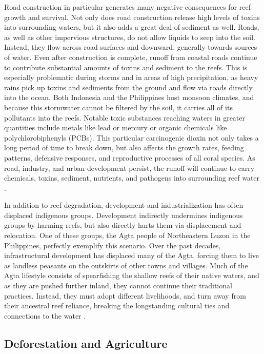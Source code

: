 \documentclass{book}\usepackage{knitr}
\begin{document}
\begin{knitrout}
\begin{kframe}
Road construction in particular generates many negative consequences for reef growth and survival. Not only does road construction release high levels of toxins into surrounding waters, but it also adds a great deal of sediment as well. Roads, as well as other impervious structures, do not allow liquids to seep into the soil. Instead, they flow across road surfaces and downward, generally towards sources of water. Even after construction is complete, runoff from coastal roads continue to contribute substantial amounts of toxins and sediment to the reefs. This is especially problematic during storms and in areas of high precipitation, as heavy rains pick up toxins and sediments from the ground and flow via roads directly into the ocean. Both Indonesia and the Philippines host monsoon climates, and because this stormwater cannot be filtered by the soil, it carries all of its pollutants into the reefs. Notable toxic substances reaching waters in greater quantities include metals like lead or mercury or organic chemicals like polychlorobiphenyls (PCBs). This particular carcinogenic dioxin not only takes a long period of time to break down, but also affects the growth rates, feeding patterns, defensive responses, and reproductive processes of all coral species. As road, industry, and urban development persist, the runoff will continue to carry chemicals, toxins, sediment, nutrients, and pathogens into surrounding reef water \citep{USEPA_2017}.

In addition to reef degradation, development and industrialization has often displaced indigenous groups. Development indirectly undermines indigenous groups by harming reefs, but also directly hurts them via displacement and relocation. One of these groups, the Agta people of Northeastern Luzon in the Philippines, perfectly exemplify this scenario. Over the past decades, infrastructural development has displaced many of the Agta, forcing them to live as landless peasants on the outskirts of other towns and villages. Much of the Agta lifestyle consists of spearfishing the shallow reefs of their native waters, and as they are pushed further inland, they cannot continue their traditional practices. Instead, they must adopt different livelihoods, and turn away from their ancestral reef reliance, breaking the longstanding cultural ties and connections to the water \citep{RePEc:gam:jsusta:v:12:y:2020:i:19:p:7983-:d:420111}.

\subsection{Deforestation and Agriculture}


\end{kframe}
\end{knitrout}
\end{document}
